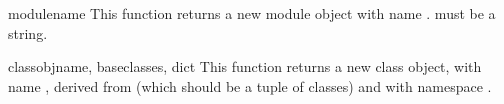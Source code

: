 \begin{funcdesc}{module}{name}
This function returns a new module object with name .
 must be a string.
\end{funcdesc}

\begin{funcdesc}{classobj}{name, baseclasses, dict}
This function returns a new class object, with name , derived
from  (which should be a tuple of classes) and with
namespace .
\end{funcdesc}
